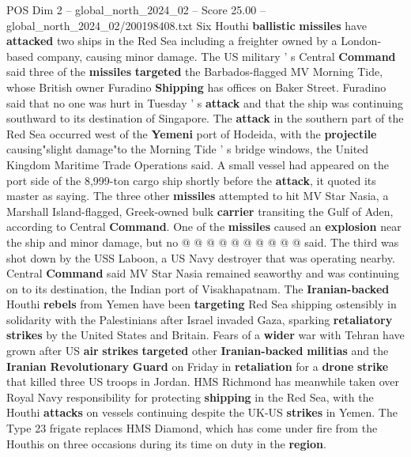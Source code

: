 \begin{textsample}{POS Dim 2 – global\_north\_2024\_02 – Score 25.00 – global\_north\_2024\_02/200198408.txt}  \label{ex:f2_pos_269}
Six Houthi \textbf{ballistic} \textbf{missiles} have \textbf{attacked} two ships in the Red Sea including a freighter owned by a London-based company, causing minor damage.
The US military ' s Central \textbf{Command} said three of the \textbf{missiles} \textbf{targeted} the Barbados-flagged MV Morning Tide, whose British owner Furadino \textbf{Shipping} has offices on Baker Street.
Furadino said that no one was hurt in Tuesday ' s \textbf{attack} and that the ship was continuing southward to its destination of Singapore.
The \textbf{attack} in the southern part of the Red Sea occurred west of the \textbf{Yemeni} port of Hodeida, with the \textbf{projectile} causing"slight damage"to the Morning Tide ' s bridge windows, the United Kingdom Maritime Trade Operations said.
A small vessel had appeared on the port side of the 8,999-ton cargo ship shortly before the \textbf{attack}, it quoted its master as saying.
The three other \textbf{missiles} attempted to hit MV Star Nasia, a Marshall Island-flagged, Greek-owned bulk \textbf{carrier} transiting the Gulf of Aden, according to Central \textbf{Command}.
One of the \textbf{missiles} caused an \textbf{explosion} near the ship and minor damage, but no @ @ @ @ @ @ @ @ @ @ said.
The third was shot down by the USS Laboon, a US Navy destroyer that was operating nearby.
Central \textbf{Command} said MV Star Nasia remained seaworthy and was continuing on to its destination, the Indian port of Visakhapatnam.
The \textbf{Iranian-backed} Houthi \textbf{rebels} from Yemen have been \textbf{targeting} Red Sea shipping ostensibly in solidarity with the Palestinians after Israel invaded Gaza, sparking \textbf{retaliatory} \textbf{strikes} by the United States and Britain.
Fears of a \textbf{wider} war with Tehran have grown after US \textbf{air} \textbf{strikes} \textbf{targeted} other \textbf{Iranian-backed} \textbf{militias} and the \textbf{Iranian} \textbf{Revolutionary} \textbf{Guard} on Friday in \textbf{retaliation} for a \textbf{drone} \textbf{strike} that killed three US troops in Jordan.
HMS Richmond has meanwhile taken over Royal Navy responsibility for protecting \textbf{shipping} in the Red Sea, with the Houthi \textbf{attacks} on vessels continuing despite the UK-US \textbf{strikes} in Yemen.
The Type 23 frigate replaces HMS Diamond, which has come under fire from the Houthis on three occasions during its time on duty in the \textbf{region}.

\end{textsample}
